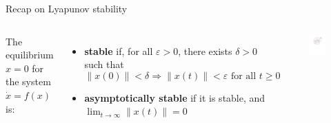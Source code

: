 \documentclass[aspectratio=169]{beamer}
\begin{document}
\begin{frame}{Recap on Lyapunov stability}
\begin{columns}
The equilibrium $x=0$ for the system $\dot x = f(x)$ is:
\begin{itemize}
\item
\textbf{stable} if, for all $\varepsilon > 0$, there exists $\delta > 0$ such that
$$
\|x(0)\| < \delta \Rightarrow \|x(t)\| < \varepsilon \text{ for all }  t \geq 0
$$
\item<2->
\textbf{asymptotically stable} if it is stable, and $\lim_{t \rightarrow \infty} \| x(t)\| = 0$
\end{itemize}
\begin{figure}
\includegraphics[width=\columnwidth]{figures/stability.pdf}
\end{figure}
\end{columns}
\end{frame}
\end{document}

